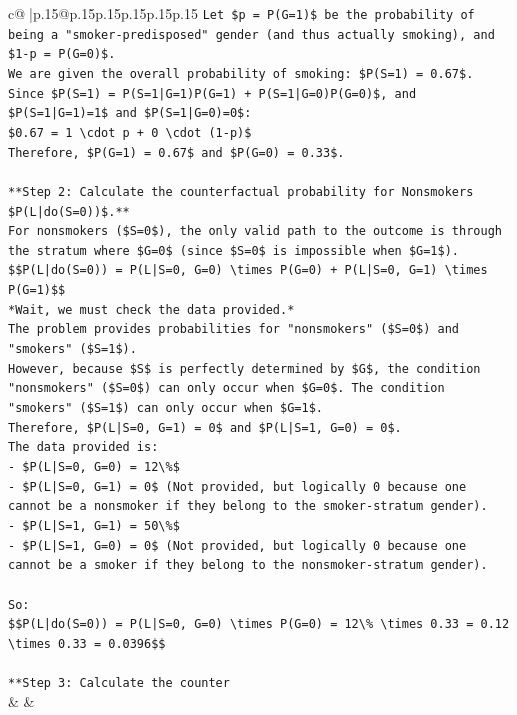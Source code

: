 \documentclass{article}
\begin{document}
{\begin{supertabular}{c@{$\;$}|p{.15\linewidth}@{}p{.15\linewidth}p{.15\linewidth}p{.15\linewidth}p{.15\linewidth}p{.15\linewidth}}
{{{\texttt{Let \$p = P(G=1)\$ be the probability of being a "smoker{-}predisposed" gender (and thus actually smoking), and \$1{-}p = P(G=0)\$.} \\
\texttt{We are given the overall probability of smoking: \$P(S=1) = 0.67\$.} \\
\texttt{Since \$P(S=1) = P(S=1|G=1)P(G=1) + P(S=1|G=0)P(G=0)\$, and \$P(S=1|G=1)=1\$ and \$P(S=1|G=0)=0\$:} \\
\texttt{\$0.67 = 1 \textbackslash{}cdot p + 0 \textbackslash{}cdot (1{-}p)\$} \\
\texttt{Therefore, \$P(G=1) = 0.67\$ and \$P(G=0) = 0.33\$.} \\
\\ 
\texttt{**Step 2: Calculate the counterfactual probability for Nonsmokers \$P(L|do(S=0))\$.**} \\
\texttt{For nonsmokers (\$S=0\$), the only valid path to the outcome is through the stratum where \$G=0\$ (since \$S=0\$ is impossible when \$G=1\$).} \\
\texttt{\$\$P(L|do(S=0)) = P(L|S=0, G=0) \textbackslash{}times P(G=0) + P(L|S=0, G=1) \textbackslash{}times P(G=1)\$\$} \\
\texttt{*Wait, we must check the data provided.*} \\
\texttt{The problem provides probabilities for "nonsmokers" (\$S=0\$) and "smokers" (\$S=1\$).} \\
\texttt{However, because \$S\$ is perfectly determined by \$G\$, the condition "nonsmokers" (\$S=0\$) can only occur when \$G=0\$. The condition "smokers" (\$S=1\$) can only occur when \$G=1\$.} \\
\texttt{Therefore, \$P(L|S=0, G=1) = 0\$ and \$P(L|S=1, G=0) = 0\$.} \\
\texttt{The data provided is:} \\
\texttt{{-} \$P(L|S=0, G=0) = 12\textbackslash{}\%\$} \\
\texttt{{-} \$P(L|S=0, G=1) = 0\$ (Not provided, but logically 0 because one cannot be a nonsmoker if they belong to the smoker{-}stratum gender).} \\
\texttt{{-} \$P(L|S=1, G=1) = 50\textbackslash{}\%\$} \\
\texttt{{-} \$P(L|S=1, G=0) = 0\$ (Not provided, but logically 0 because one cannot be a smoker if they belong to the nonsmoker{-}stratum gender).} \\
\\ 
\texttt{So:} \\
\texttt{\$\$P(L|do(S=0)) = P(L|S=0, G=0) \textbackslash{}times P(G=0) = 12\textbackslash{}\% \textbackslash{}times 0.33 = 0.12 \textbackslash{}times 0.33 = 0.0396\$\$} \\
\\ 
\texttt{**Step 3: Calculate the counter} \\
            }
        }
    }
    & & \\ \\


\end{supertabular}}
\end{document}
